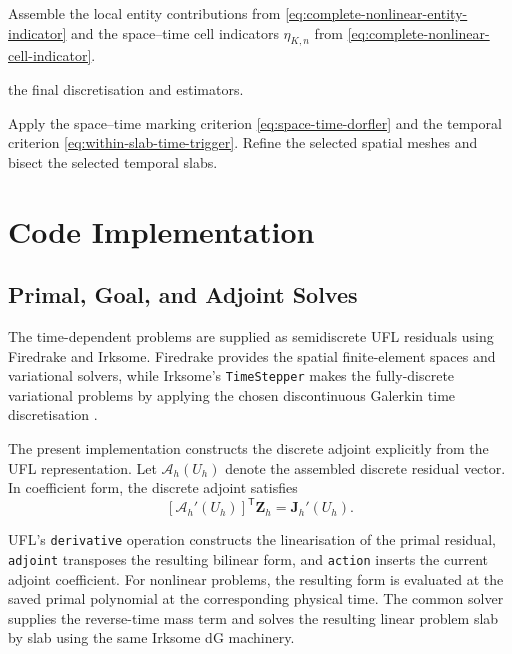 \begin{algorithm}[!htbp]
\begin{algorithmic}[1]
  \State Assemble the local entity contributions from \eqref{eq:complete-nonlinear-entity-indicator} and the space--time cell indicators \(\eta_{K,n}\) from \eqref{eq:complete-nonlinear-cell-indicator}.
  
    \State \Return the final discretisation and estimators.
  \EndIf
  
  \State Apply the space--time marking criterion \eqref{eq:space-time-dorfler} and the temporal criterion \eqref{eq:within-slab-time-trigger}.
  \State Refine the selected spatial meshes and bisect the selected temporal slabs.
\EndWhile
\end{algorithmic}
\end{algorithm}



\section{Code Implementation}
\label{sec:single-indicator-loop}

\subsection{Primal, Goal, and Adjoint Solves}
\label{sec:primal-goal-adjoint-solves}

The time-dependent problems are supplied as semidiscrete UFL residuals using Firedrake and Irksome. Firedrake provides the spatial finite-element spaces and variational solvers, while Irksome's \texttt{TimeStepper} makes the fully-discrete variational problems by applying the chosen discontinuous Galerkin time discretisation \cite{andrews2026automatedgalerkintimestepping}.

The present implementation constructs the discrete adjoint explicitly from the UFL representation. Let \(\mathcal A_h(U_h)\) denote the assembled discrete residual vector. In coefficient form, the discrete adjoint satisfies
\[
[\mathcal A_h'(U_h)]^{\mathsf T}\mathbf Z_h
=
\mathbf J_h'(U_h).
\]

UFL’s \texttt{derivative} operation constructs the linearisation of the primal residual, \texttt{adjoint} transposes the resulting bilinear form, and \texttt{action} inserts the current adjoint coefficient. For nonlinear problems, the resulting form is evaluated at the saved primal polynomial at the corresponding physical time. The common solver supplies the reverse-time mass term and solves the resulting linear problem slab by slab using the same Irksome dG machinery.

